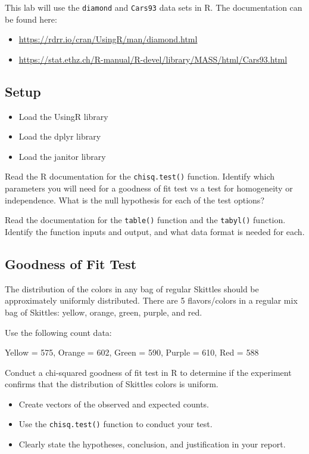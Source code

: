 \documentclass{article}
\begin{document}
This lab will use the \texttt{diamond} and \texttt{Cars93} data sets in R. The documentation can be found here:

\begin{itemize}
    \item \url{https://rdrr.io/cran/UsingR/man/diamond.html}
    \item \url{https://stat.ethz.ch/R-manual/R-devel/library/MASS/html/Cars93.html}
\end{itemize}

\subsection*{Setup}

\begin{itemize}
    \item Load the UsingR library
    \item Load the dplyr library
    \item Load the janitor library
\end{itemize}

Read the R documentation for the \texttt{chisq.test()} function. Identify which parameters you will need for a goodness of fit test vs a test for homogeneity or independence.  
What is the null hypothesis for each of the test options?

Read the documentation for the \texttt{table()} function and the \texttt{tabyl()} function.  
Identify the function inputs and output, and what data format is needed for each.

\subsection*{Goodness of Fit Test}

The distribution of the colors in any bag of regular Skittles should be approximately uniformly distributed. There are 5 flavors/colors in a regular mix bag of Skittles: yellow, orange, green, purple, and red.

Use the following count data:

\begin{center}
Yellow = 575, Orange = 602, Green = 590, Purple = 610, Red = 588
\end{center}

Conduct a chi-squared goodness of fit test in R to determine if the experiment confirms that the distribution of Skittles colors is uniform.
\begin{itemize}
    \item Create vectors of the observed and expected counts.
    \item Use the \texttt{chisq.test()} function to conduct your test.
    \item Clearly state the hypotheses, conclusion, and justification in your report.
\end{itemize}
\end{document}
